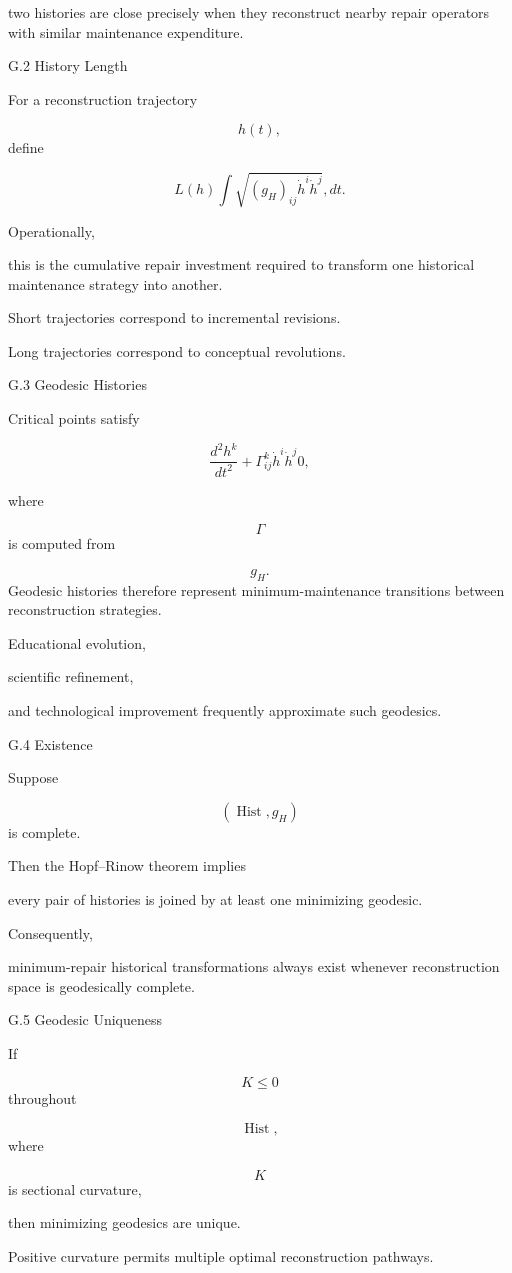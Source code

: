 \documentclass[12pt,oneside]{article}
\theoremstyle{plain}
\theoremstyle{definition}
\theoremstyle{remark}
\DeclareMathOperator{\Hist}{Hist}
\begin{document}
two histories are close precisely when they reconstruct nearby repair operators with similar maintenance expenditure.


G.2 History Length

For a reconstruction trajectory

\[
h(t),
\]
define

\[
L(h)
\int
\sqrt{
(g_H)_{ij}
\dot h^i
\dot h^j
}
,dt.
\]

Operationally,

this is the cumulative repair investment required to transform one historical maintenance strategy into another.

Short trajectories correspond to incremental revisions.

Long trajectories correspond to conceptual revolutions.


G.3 Geodesic Histories

Critical points satisfy

\[
\frac{d^2h^k}{dt^2}
+
\Gamma^k_{ij}
\dot h^i
\dot h^j
0,
\]

where

\[
\Gamma
\]
is computed from

\[
g_H.
\]
Geodesic histories therefore represent minimum-maintenance transitions between reconstruction strategies.

Educational evolution,

scientific refinement,

and technological improvement frequently approximate such geodesics.


G.4 Existence

Suppose

\[
(\Hist,g_H)
\]
is complete.

Then the Hopf–Rinow theorem implies

every pair of histories is joined by at least one minimizing geodesic.

Consequently,

minimum-repair historical transformations always exist whenever reconstruction space is geodesically complete.


G.5 Geodesic Uniqueness

If

\[
K\le0
\]
throughout

\[
\Hist,
\]
where

\[
K
\]
is sectional curvature,

then minimizing geodesics are unique.

Positive curvature permits multiple optimal reconstruction pathways.
\end{document}
